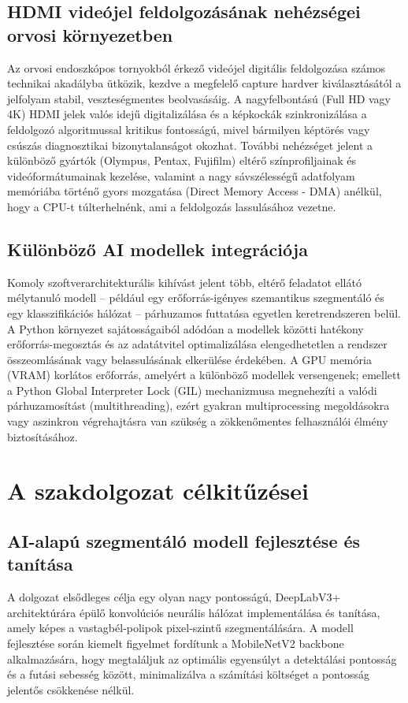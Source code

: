 \documentclass[12pt, a4paper]{report}
\begin{document}
\subsection{HDMI videójel feldolgozásának nehézségei orvosi környezetben}
Az orvosi endoszkópos tornyokból érkező videójel digitális feldolgozása számos technikai akadályba ütközik, kezdve a megfelelő capture hardver kiválasztásától a jelfolyam stabil, veszteségmentes beolvasásáig. A nagyfelbontású (Full HD vagy 4K) HDMI jelek valós idejű digitalizálása és a képkockák szinkronizálása a feldolgozó algoritmussal kritikus fontosságú, mivel bármilyen képtörés vagy csúszás diagnosztikai bizonytalanságot okozhat. További nehézséget jelent a különböző gyártók (Olympus, Pentax, Fujifilm) eltérő színprofiljainak és videóformátumainak kezelése, valamint a nagy sávszélességű adatfolyam memóriába történő gyors mozgatása (Direct Memory Access - DMA) anélkül, hogy a CPU-t túlterhelnénk, ami a feldolgozás lassulásához vezetne.

\subsection{Különböző AI modellek integrációja}
Komoly szoftverarchitekturális kihívást jelent több, eltérő feladatot ellátó mélytanuló modell – például egy erőforrás-igényes szemantikus szegmentáló és egy klasszifikációs hálózat – párhuzamos futtatása egyetlen keretrendszeren belül. A Python környezet sajátosságaiból adódóan a modellek közötti hatékony erőforrás-megosztás és az adatátvitel optimalizálása elengedhetetlen a rendszer összeomlásának vagy belassulásának elkerülése érdekében. A GPU memória (VRAM) korlátos erőforrás, amelyért a különböző modellek versengenek; emellett a Python Global Interpreter Lock (GIL) mechanizmusa megnehezíti a valódi párhuzamosítást (multithreading), ezért gyakran multiprocessing megoldásokra vagy aszinkron végrehajtásra van szükség a zökkenőmentes felhasználói élmény biztosításához.

\section{A szakdolgozat célkitűzései}

\subsection{AI-alapú szegmentáló modell fejlesztése és tanítása}
A dolgozat elsődleges célja egy olyan nagy pontosságú, DeepLabV3+ architektúrára épülő konvolúciós neurális hálózat implementálása és tanítása, amely képes a vastagbél-polipok pixel-szintű szegmentálására. A modell fejlesztése során kiemelt figyelmet fordítunk a MobileNetV2 backbone alkalmazására, hogy megtaláljuk az optimális egyensúlyt a detektálási pontosság és a futási sebesség között, minimalizálva a számítási költséget a pontosság jelentős csökkenése nélkül.
\end{document}
